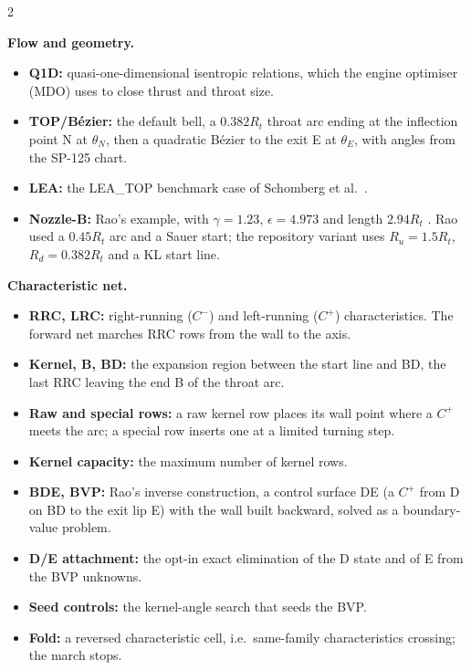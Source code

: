 \begingroup\footnotesize
\setlength{\parskip}{1.5pt}\setlength{\columnsep}{14pt}
\begin{multicols}{2}\raggedright
\textbf{Flow and geometry.}
\begin{itemize}
\item \textbf{Q1D:} quasi-one-dimensional isentropic relations, which the engine
optimiser (MDO) uses to close thrust and throat size.
\item \textbf{TOP/B\'ezier:} the default bell, a $0.382R_t$ throat arc ending at the
inflection point N at $\theta_N$, then a quadratic B\'ezier to the exit E at
$\theta_E$, with angles from the SP-125 chart.
\item \textbf{LEA:} the LEA\_TOP benchmark case of Schomberg et al.\ \cite{schomberg2019}.
\item \textbf{Nozzle-B:} Rao's example, with $\gamma=1.23$, $\epsilon=4.973$ and length
$2.94R_t$ \cite[PDF pp.~2--5, printed pp.~378--381]{rao1958}. Rao used a $0.45R_t$
arc and a Sauer start; the repository variant uses $R_u=1.5R_t$, $R_d=0.382R_t$ and
a KL start line.
\end{itemize}

\textbf{Characteristic net.}
\begin{itemize}
\item \textbf{RRC, LRC:} right-running ($C^-$) and left-running ($C^+$)
characteristics. The forward net marches RRC rows from the wall to the axis.
\item \textbf{Kernel, B, BD:} the expansion region between the start line and BD, the
last RRC leaving the end B of the throat arc.
\item \textbf{Raw and special rows:} a raw kernel row places its wall point where a
$C^+$ meets the arc; a special row inserts one at a limited turning step.
\item \textbf{Kernel capacity:} the maximum number of kernel rows.
\item \textbf{BDE, BVP:} Rao's inverse construction, a control surface DE (a $C^+$ from
D on BD to the exit lip E) with the wall built backward, solved as a boundary-value
problem.
\item \textbf{D/E attachment:} the opt-in exact elimination of the D state and of E
from the BVP unknowns.
\item \textbf{Seed controls:} the kernel-angle search that seeds the BVP.
\item \textbf{Fold:} a reversed characteristic cell, i.e.\ same-family characteristics
crossing; the march stops.
\end{itemize}


\end{multicols}
